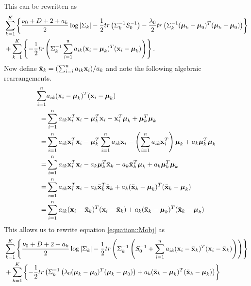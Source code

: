 \documentclass[12pt,english]{article}
\begin{document}
This can be rewritten as
\begin{equation}\label{equation::Mobj}
\begin{split}
&\sum_{k=1}^{K} \left\{\frac{\nu_0 + D + 2 + a_k }{2} \log|\Sigma_k|  - \frac{1}{2} tr \left(\Sigma_{k}^{-1} S_0^{-1}\right) - \frac{\lambda_0}{2} tr \left( \Sigma_{k}^{-1}(\boldsymbol{\mu}_k - \boldsymbol{\mu}_0)^T(\boldsymbol{\mu}_k - \boldsymbol{\mu}_0) \right)\right\} \\
& + \sum_{k=1}^{K} \left\{- \frac{1}{2} tr\left(\Sigma_{k}^{-1}\sum_{i=1}^{n}a_{ik}({\bf x}_i - \boldsymbol{\mu}_k)^{T}({\bf x}_i - \boldsymbol{\mu}_k)\right) \right\}.
\end{split}
\end{equation}
Now define $\bar{{\bf x}}_k = (\sum_{i=i}^{n}a_{ik}{\bf x}_i)/a_k$ and note the following algebraic rearrangements.
\begin{equation}
\begin{split}
\sum_{i=1}^{n} &a_{ik}({\bf x}_i - \boldsymbol{\mu}_k)^{T}({\bf x}_i - \boldsymbol{\mu}_k)\\
 = & \sum_{i=1}^{n} a_{ik}{\bf x}_i^{T}{\bf x}_i - \boldsymbol{\mu}_k^{T}{\bf x}_i -  {\bf x}_i^{T}\boldsymbol{\mu}_k + \boldsymbol{\mu}_k^{T}\boldsymbol{\mu}_k\\
 = & \sum_{i=1}^{n} a_{ik}{\bf x}_i^{T}{\bf x}_i - \boldsymbol{\mu}_k^{T} \sum_{i=1}^{n} a_{ik}{\bf x}_i -  \left(\sum_{i=1}^{n} a_{ik}{\bf x}_i^{T}\right)\boldsymbol{\mu}_k + a_k\boldsymbol{\mu}_k^{T}\boldsymbol{\mu}_k\\
  = & \sum_{i=1}^{n} a_{ik}{\bf x}_i^{T}{\bf x}_i - a_k\boldsymbol{\mu}_k^{T}\bar{{\bf x}}_k -  a_k \bar{{\bf x}}_k^{T}\boldsymbol{\mu}_k + a_k\boldsymbol{\mu}_k^{T}\boldsymbol{\mu}_k\\
  = & \sum_{i=1}^{n} a_{ik}{\bf x}_i^{T}{\bf x}_i - a_k\bar{{\bf x}}_k^{T}\bar{{\bf x}}_k + a_k(\bar{{\bf x}}_k - \boldsymbol{\mu}_k)^{T} (\bar{{\bf x}}_k - \boldsymbol{\mu}_k)\\
  = & \sum_{i=1}^{n} a_{ik}({\bf x}_i -\bar{{\bf x}}_k)^{T}({\bf x}_i -\bar{{\bf x}}_k) + a_k(\bar{{\bf x}}_k - \boldsymbol{\mu}_k)^{T} (\bar{{\bf x}}_k - \boldsymbol{\mu}_k)\\
\end{split}
\end{equation}
This allows us to rewrite equation \ref{equation::Mobj} as
\begin{equation}\label{equation::Mobj2}
\begin{split}
&\sum_{k=1}^{K} \left\{\frac{\nu_0 + D + 2 + a_k }{2} \log|\Sigma_k|  - \frac{1}{2} tr \left(\Sigma_{k}^{-1} \left(S_0^{-1}+ \sum_{i=1}^{n} a_{ik}({\bf x}_i -\bar{{\bf x}}_k)^{T}({\bf x}_i -\bar{{\bf x}}_k) \right)\right)\right\}\\
& +  \sum_{k=1}^{K}\left\{-\frac{1}{2} tr \left( \Sigma_{k}^{-1}\left(\lambda_0(\boldsymbol{\mu}_k - \boldsymbol{\mu}_0)^T(\boldsymbol{\mu}_k - \boldsymbol{\mu}_0)\right) + a_k(\bar{{\bf x}}_k - \boldsymbol{\mu}_k)^{T} (\bar{{\bf x}}_k - \boldsymbol{\mu}_k)\right)\right\} \\
\end{split}
\end{equation}
\end{document}
